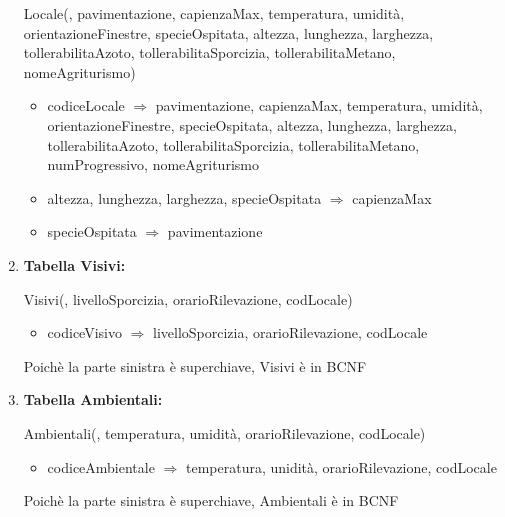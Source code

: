 \documentclass[12pt,a4paper]{article}
\begin{document}
\begin{enumerate}
Locale(\underline{}, pavimentazione, capienzaMax, temperatura, umidità, orientazioneFinestre, specieOspitata, altezza, lunghezza, larghezza, tollerabilitaAzoto, tollerabilitaSporcizia, tollerabilitaMetano, nomeAgriturismo)
\begin{itemize}
\vspace{-5pt}
\item codiceLocale $\Rightarrow$ pavimentazione, capienzaMax, temperatura, umidità, orientazioneFinestre, specieOspitata, altezza, lunghezza, larghezza, tollerabilitaAzoto, tollerabilitaSporcizia, tollerabilitaMetano,  numProgressivo,  nomeAgriturismo
\item altezza, lunghezza, larghezza, specieOspitata $\Rightarrow$ capienzaMax
\item specieOspitata $\Rightarrow$ pavimentazione
\vspace{-5pt}
\end{itemize}
\vspace{10pt}



\item[] \textbf{Tabella Visivi:}

Visivi(\underline{}, livelloSporcizia,  orarioRilevazione,  codLocale)
\begin{itemize}
\vspace{-5pt}
\item codiceVisivo $\Rightarrow$ livelloSporcizia, orarioRilevazione, codLocale
\vspace{-5pt}
\end{itemize}
Poichè la parte sinistra è superchiave, Visivi è in BCNF
\vspace{10pt}



\item[] \textbf{Tabella Ambientali:}

Ambientali(\underline{}, temperatura, umidità,  orarioRilevazione,  codLocale)
\begin{itemize}
\vspace{-5pt}
\item codiceAmbientale $\Rightarrow$ temperatura, unidità, orarioRilevazione, codLocale
\vspace{-5pt}
\end{itemize}
Poichè la parte sinistra è superchiave, Ambientali è in BCNF
\vspace{10pt}




\end{enumerate}
\end{document}
